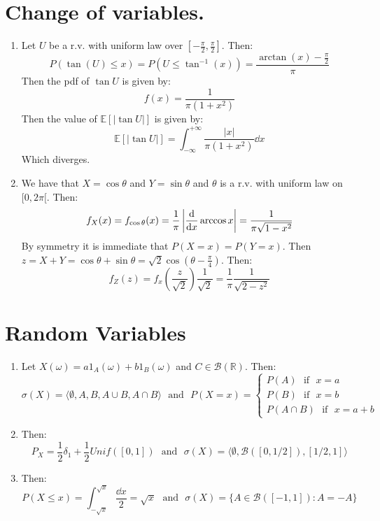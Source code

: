 \documentclass[10pt,a4paper]{book}
\begin{document}
\section{Change of variables.}

\begin{enumerate}

\item Let $U$ be a r.v. with uniform law over $[-\frac{\pi}{2}, \frac{\pi}{2}]$. Then:
\[
P(\tan(U) \leq x) = P(U \leq \tan^{-1}(x)) = \frac{\arctan(x) - \frac{\pi}{2}}{\pi} 
\]
Then the pdf of $\tan U$ is given by:
\[
f(x) = \frac{1}{\pi(1 + x^2)}
\]
Then the value of $\mathbb{E}[|\tan U|]$ is given by:
\[
\mathbb{E}[|\tan U|] = \int_{-\infty}^{+\infty} \frac{|x|}{\pi(1 + x^2)} \dd x
\]
Which diverges. 

\item We have that $X = \cos \theta$ and $Y = \sin \theta$ and $\theta$ is a r.v. with uniform law on $[0, 2\pi[$. Then:
\[
f_X(x) = f_{\cos \theta}(x) = \frac{1}{\pi} \left|\dv{}{x} \arccos x\right| = \frac{1}{\pi \sqrt{1 - x^2}}
\]  
By symmetry it is immediate that $P(X = x) = P(Y = x)$. Then $z = X+ Y = \cos \theta + \sin \theta = \sqrt{2} \cos(\theta - \frac{\pi}{4})$. Then:
\[
f_Z(z) = f_x\left(\frac{z}{\sqrt{2}}\right) \frac{1}{\sqrt{2}} = \frac{1}{\pi}\frac{1}{\sqrt{2 - z^2}}
\]

\end{enumerate}

\section{Random Variables}
\begin{enumerate}

\item Let $X(\omega) = a 1_A(\omega) + b 1_B(\omega)$ and $C \in \mathcal{B}(\mathbb{R})$. Then:
\[
\sigma(X) = \langle \emptyset, A, B, A \cup B, A \cap B \rangle \mbox{~~and~~} P(X = x) = \begin{cases}
P(A)  \mbox{~~if~~} x = a\\
P(B)  \mbox{~~if~~} x = b\\
P(A \cap B)  \mbox{~~if~~} x = a + b
\end{cases}
\]

\item Then:
\[
P_X = \frac{1}{2} \delta_1 + \frac{1}{2} Unif([0, 1]) \mbox{~~and~~} \sigma(X) = \langle \emptyset, \mathcal{B}([0, 1/2]), [1/2, 1] \rangle
\]

\item Then:
\[
P(X \leq x) = \int_{-\sqrt{x}}^{\sqrt{x}} \frac{\dd x}{2} = \sqrt{x} \mbox{~~and~~} \sigma(X) = \{A \in \mathcal{B}([-1, 1]) : A = -A\}
\]

\end{enumerate}
\end{document}
